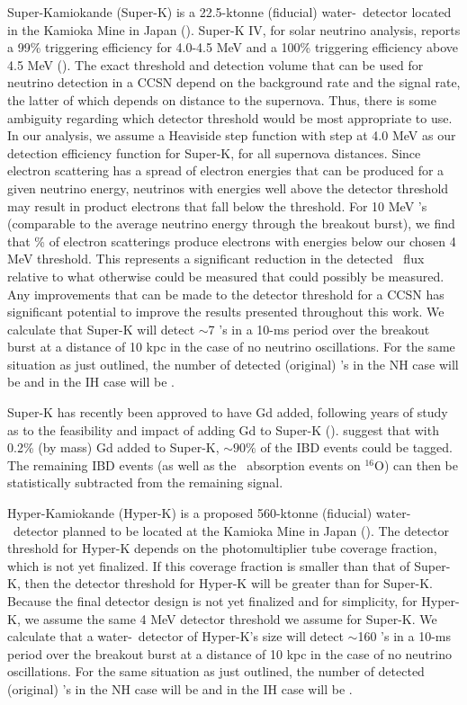 Super-Kamiokande (Super-K) is a 22.5-ktonne (fiducial) water-\cer\ 
detector located
in the Kamioka Mine in Japan (\citealp{fukudaetal2003,ikedaetal2007}).
Super-K
 IV, for solar
 neutrino analysis, reports a 99\% triggering efficiency for 4.0-4.5 
MeV and a 100\% triggering efficiency above 4.5 MeV
(\citealt{sekiya2013}).  The exact threshold and detection volume that
can be used for neutrino detection in a CCSN depend on the background
rate and the signal rate, the latter of which depends on distance to
the supernova.  Thus, there is some ambiguity regarding which detector
threshold would be most appropriate to use.
In our analysis, we assume a Heaviside step function with 
step at 4.0 MeV as our detection efficiency function for Super-K, for
all supernova distances.  Since electron scattering
has a spread of electron energies that can be produced for a given
neutrino energy, neutrinos with energies well above the detector
threshold may result in product electrons that fall below the
threshold.  For 10 MeV \nue's (comparable to the average neutrino
energy through the breakout burst), we find that \abt 40\% of electron
scatterings produce electrons with energies below our chosen 4 MeV
threshold.
This represents a significant reduction in the detected \nue\ flux
relative to what otherwise could be measured that could possibly be measured. 
Any improvements that can be made to the detector threshold for
a CCSN has significant potential to 
improve the results presented throughout this work.
  We calculate 
that Super-K  will detect $\sim$7 \nue's in a 10-ms period over the
breakout burst at a distance of 10 kpc in the case of no neutrino
oscillations.  For the same situation as just outlined, the number of
detected (original) \nue's in the NH case will be \abt 0 and in the IH
case will be \abt 1.

Super-K has recently been approved to have Gd added, following
years of study as to the  feasibility and impact of adding Gd to 
Super-K (\citealp{beacomvagins2004,watanabe2009,vagins2012,mori2013}).  
\cite{beacomvagins2004} suggest that with 0.2\% (by mass) 
Gd added to Super-K,
${\sim}90\%$ of the IBD events could be tagged. The remaining
IBD events (as well as the \anue\ absorption events on $^{16}$O) 
can then be statistically subtracted from the remaining
signal.  

Hyper-Kamiokande (Hyper-K) is a proposed 560-ktonne (fiducial) water-\cer\
detector planned to be located at the Kamioka Mine in Japan
(\citealt{abeetal2011}). The detector threshold for Hyper-K depends on
the photomultiplier tube coverage fraction, which is not yet
finalized.  If this coverage fraction is smaller than that of Super-K,
then the detector threshold for Hyper-K will be greater than for
Super-K.  Because the final detector design is not yet finalized and
for simplicity, for Hyper-K, we assume the same 4 MeV 
detector threshold
we assume for Super-K.  We calculate 
that a water-\cer\ detector of Hyper-K's size  will detect 
$\sim$160 \nue's in a 10-ms period over the
breakout burst at a distance of 10 kpc in the case of no neutrino
oscillations.  For the same situation as just outlined, the number of
detected (original) \nue's in the NH case will be \abt 30 and in the IH
case will be \abt 70.

